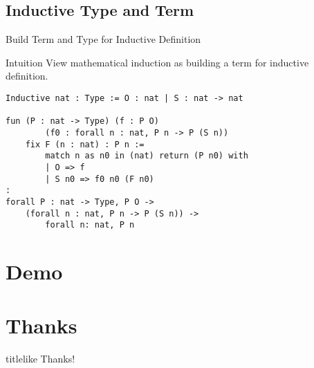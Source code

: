 \documentclass[UTF-8]{beamer}
\begin{document}
\subsection{Inductive Type and Term}
\begin{frame}[fragile]{Build Term and Type for Inductive Definition}
\begin{exampleblock}{Intuition}
    View mathematical induction as building a term for inductive definition.
\end{exampleblock}

\begin{verbatim}
Inductive nat : Type := O : nat | S : nat -> nat

fun (P : nat -> Type) (f : P O) 
        (f0 : forall n : nat, P n -> P (S n)) 
    fix F (n : nat) : P n :=
        match n as n0 in (nat) return (P n0) with
        | O => f
        | S n0 => f0 n0 (F n0)
:
forall P : nat -> Type, P O -> 
    (forall n : nat, P n -> P (S n)) -> 
        forall n: nat, P n
\end{verbatim}
\end{frame}

\section{Demo}
\begin{frame}
\end{frame}


\section*{Thanks}
\begin{frame}
\LARGE
\begin{beamercolorbox}[center,ht=3em]{titlelike}
\vspace{1em}
Thanks!
\end{beamercolorbox}
\end{frame}
\end{document}
